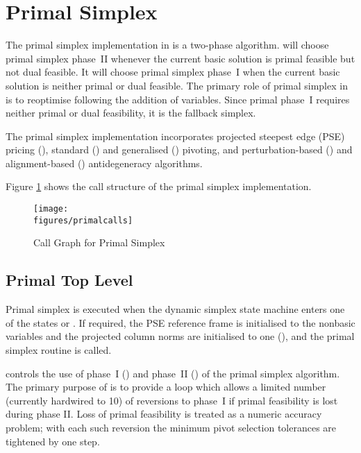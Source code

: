 
\section{Primal Simplex}
\label{sec:PrimalSimplex}

The primal simplex implementation in \dylp is a two-phase algorithm.
\dylp will choose primal simplex phase~II whenever the current basic
solution is primal feasible but not dual feasible.
It will choose primal simplex phase~I when the current basic solution
is neither primal or dual feasible.
The primary role of primal simplex in \dylp is to reoptimise following the
addition of variables.
Since primal phase~I requires neither primal or dual feasibility, it is the
fallback simplex.

The primal simplex implementation incorporates projected steepest edge (PSE)
pricing (),
standard () and
generalised () pivoting, and
perturbation-based () and
alignment-based () antidegeneracy algorithms.

Figure \ref{fig:PrimalCallGraph} shows the call structure of the primal simplex
implementation.
\begin{figure}[htb]
\centering
\texttt{[image: \\figures/primalcalls]}
\caption{Call Graph for Primal Simplex} \label{fig:PrimalCallGraph}
\end{figure}

\subsection{Primal Top Level}

Primal simplex is executed when the dynamic simplex state machine enters one
of the states  or .
If required, the PSE reference frame is initialised to the
nonbasic variables and the projected column norms are initialised to one
(\vid {}), and
the primal simplex routine  is called.

 controls the use of phase~I () and
phase~II () of the primal simplex algorithm.
The primary purpose of  is to provide a loop which allows a
limited number (currently hardwired to 10) of reversions
to phase~I if primal feasibility is lost during phase II.
Loss of primal feasibility is treated as a numeric accuracy problem; with each
such reversion the minimum pivot selection tolerances are tightened by one
step.

